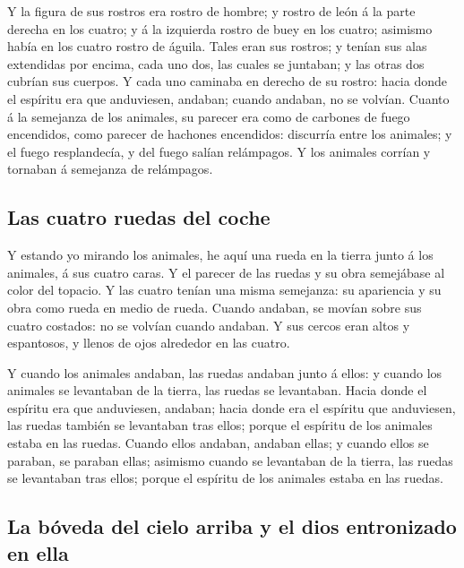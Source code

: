  Y la figura de sus rostros era rostro de hombre; y
rostro de león á la parte derecha en los cuatro; y á la izquierda rostro
de buey en los cuatro; asimismo había en los cuatro rostro de águila.
 Tales eran sus rostros; y tenían sus alas extendidas por
encima, cada uno dos, las cuales se juntaban; y las otras dos cubrían
sus cuerpos.  Y cada uno caminaba en derecho de su
rostro: hacia donde el espíritu era que anduviesen, andaban; cuando
andaban, no se volvían.  Cuanto á la semejanza de los
animales, su parecer era como de carbones de fuego encendidos, como
parecer de hachones encendidos: discurría entre los animales; y el fuego
resplandecía, y del fuego salían relámpagos.  Y los
animales corrían y tornaban á semejanza de relámpagos.

\hypertarget{las-cuatro-ruedas-del-coche}{%
\subsection{Las cuatro ruedas del
coche}\label{las-cuatro-ruedas-del-coche}}

 Y estando yo mirando los animales, he aquí una rueda en
la tierra junto á los animales, á sus cuatro caras.  Y el
parecer de las ruedas y su obra semejábase al color del topacio. Y las
cuatro tenían una misma semejanza: su apariencia y su obra como rueda en
medio de rueda.  Cuando andaban, se movían sobre sus
cuatro costados: no se volvían cuando andaban.  Y sus
cercos eran altos y espantosos, y llenos de ojos alrededor en las
cuatro.

 Y cuando los animales andaban, las ruedas andaban junto
á ellos: y cuando los animales se levantaban de la tierra, las ruedas se
levantaban.  Hacia donde el espíritu era que anduviesen,
andaban; hacia donde era el espíritu que anduviesen, las ruedas también
se levantaban tras ellos; porque el espíritu de los animales estaba en
las ruedas.  Cuando ellos andaban, andaban ellas; y
cuando ellos se paraban, se paraban ellas; asimismo cuando se levantaban
de la tierra, las ruedas se levantaban tras ellos; porque el espíritu de
los animales estaba en las ruedas.

\hypertarget{la-buxf3veda-del-cielo-arriba-y-el-dios-entronizado-en-ella}{%
\subsection{La bóveda del cielo arriba y el dios entronizado en
ella}\label{la-buxf3veda-del-cielo-arriba-y-el-dios-entronizado-en-ella}}

